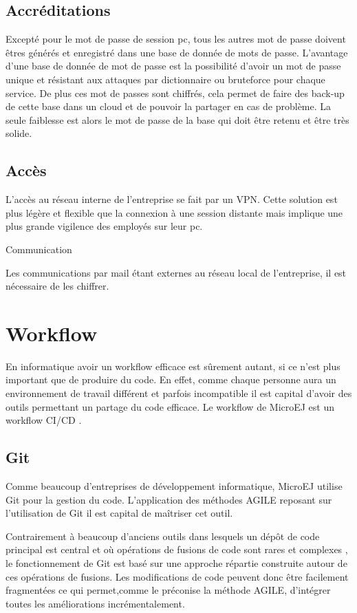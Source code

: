 \documentclass[french,a4paper,12pt]{report}
\begin{document}
\subsection{Accréditations}

Excepté pour le mot de passe de session pc, tous les autres mot de passe doivent êtres générés et enregistré dans une base de donnée de mots de passe. L’avantage d’une base de donnée de mot de passe est la possibilité d’avoir un mot de passe unique et résistant aux attaques par dictionnaire ou bruteforce pour chaque service. De plus ces mot de passes sont chiffrés, cela permet de faire des back-up de cette base dans un cloud et de pouvoir la partager en cas de problème. La seule faiblesse est alors le mot de passe de la base qui doit être retenu et être très solide.

\subsection{Accès}

L’accès au réseau interne de l’entreprise se fait par un VPN. Cette solution est plus légère et flexible que la connexion à une session distante mais implique une plus grande vigilence des employés sur leur pc. 

Communication

Les communications par mail étant externes au réseau local de l’entreprise, il est nécessaire de les chiffrer.  

\section{Workflow}

En informatique avoir un workflow efficace est sûrement autant, si ce n’est plus important que de produire du code. En effet, comme chaque personne aura un environnement de travail différent et parfois incompatible il est capital d’avoir des outils permettant un partage du code efficace. Le workflow de MicroEJ est un workflow CI/CD .

\subsection{Git}

Comme beaucoup d'entreprises de développement informatique, MicroEJ utilise Git pour la gestion du code. L'application des méthodes AGILE reposant sur l'utilisation de Git il est capital de maîtriser cet outil.

Contrairement à beaucoup d'anciens outils dans lesquels un dépôt de code principal est central et où opérations de fusions de code sont rares et complexes , le fonctionnement de Git est basé sur une approche répartie construite autour de ces opérations de fusions. Les modifications de code peuvent donc être facilement fragmentées ce qui permet,comme le préconise la méthode AGILE, d'intégrer toutes les améliorations incrémentalement. 
\end{document}
